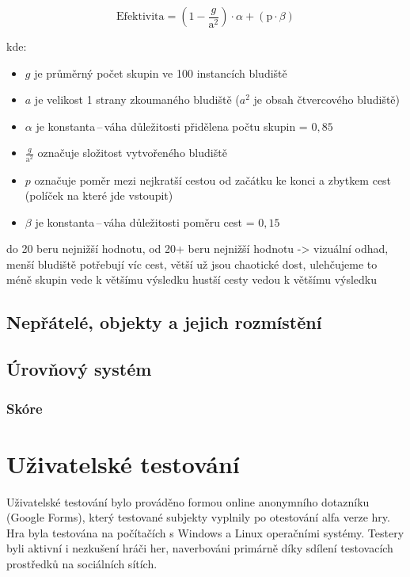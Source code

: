 \begin{equation}
    \text{Efektivita} = \left(1 - \frac{g}{\text{a}^2}\right) \cdot \alpha + \left(\text{p} \cdot \beta \right)
\end{equation}

kde: 
\begin{itemize}
    \item $g$ je průměrný počet skupin ve 100 instancích bludiště
    \item $a$ je velikost 1 strany zkoumaného bludiště ($a^2$ je obsah čtvercového bludiště)
    \item $\alpha$ je konstanta\,--\,váha důležitosti přidělena počtu skupin = $0,85$
    \item $\frac{g}{\text{a}^2}$ označuje složitost vytvořeného bludiště
    \item $p$ označuje poměr mezi nejkratší cestou od začátku ke konci a zbytkem cest (políček na které jde vstoupit)
    \item $\beta$ je konstanta\,--\,váha důležitosti poměru cest = $0,15$
\end{itemize}
do 20 beru nejnižší hodnotu, od 20+ beru nejnižší hodnotu -> vizuální odhad, menší bludiště potřebují víc cest, větší už jsou chaotické dost, ulehčujeme to
 méně skupin vede k většímu výsledku
  hustší cesty vedou k většímu výsledku
\newpage
\section{Nepřátelé, objekty a jejich rozmístění}

\section{Úrovňový systém}

\subsection*{Skóre}

\chapter{Uživatelské testování}
Uživatelské testování bylo prováděno formou online anonymního dotazníku (Google Forms), který testované subjekty vyplnily po otestování alfa verze hry. Hra byla testována na počítačích s Windows a Linux operačními systémy. Testery byli aktivní i nezkušení hráči her, naverbováni primárně díky sdílení testovacích prostředků na sociálních sítích.
